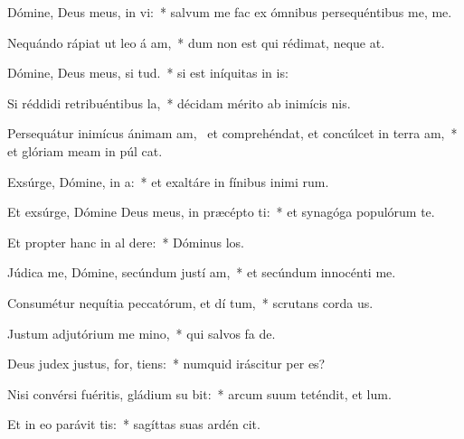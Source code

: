 \item Dómine, Deus meus, in  vi:~* salvum me fac ex ómnibus persequéntibus me,   me.
\item Nequándo rápiat ut leo á am,~* dum non est qui rédimat, neque   at.
\item Dómine, Deus meus, si  tud.~* si est iníquitas in  is:
\item Si réddidi retribuéntibus  la,~* décidam mérito ab inimícis  nis.
\item Persequátur inimícus ánimam am,~\pscross{} et comprehéndat, et concúlcet in terra  am,~* et glóriam meam in púl cat.
\item Exsúrge, Dómine, in  a:~* et exaltáre in fínibus inimi rum.
\item Et exsúrge, Dómine Deus meus, in præcépto  ti:~* et synagóga populórum  te.
\item Et propter hanc in al dere:~* Dóminus  los.
\item Júdica me, Dómine, secúndum justí am,~* et secúndum innocénti   me.
\item Consumétur nequítia peccatórum, et dí tum,~* scrutans corda   us.
\item Justum adjutórium me  mino,~* qui salvos fa  de.
\item Deus judex justus, for,  tiens:~* numquid iráscitur per  es?
\item Nisi convérsi fuéritis, gládium su bit:~* arcum suum teténdit, et  lum.
\item Et in eo parávit  tis:~* sagíttas suas ardén cit.
